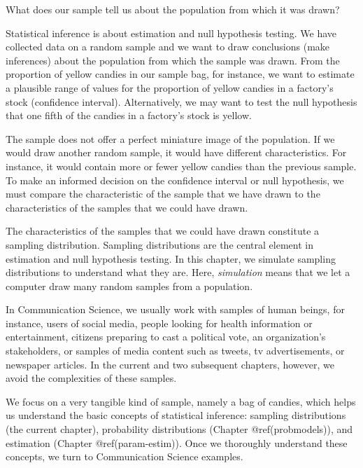 \documentclass[
  letterpaper,
  DIV=11,
  numbers=noendperiod]{scrreprt}
\begin{document}


What does our sample tell us about the population from which it was
drawn? 

Statistical inference is about estimation and null hypothesis testing.
We have collected data on a random sample and we want to draw
conclusions (make inferences) about the population from which the sample
was drawn. From the proportion of yellow candies in our sample bag, for
instance, we want to estimate a plausible range of values for the
proportion of yellow candies in a factory's stock (confidence interval).
Alternatively, we may want to test the null hypothesis that one fifth of
the candies in a factory's stock is yellow.

The sample does not offer a perfect miniature image of the population.
If we would draw another random sample, it would have different
characteristics. For instance, it would contain more or fewer yellow
candies than the previous sample. To make an informed decision on the
confidence interval or null hypothesis, we must compare the
characteristic of the sample that we have drawn to the characteristics
of the samples that we could have drawn.

The characteristics of the samples that we could have drawn constitute a
sampling distribution. Sampling distributions are the central element in
estimation and null hypothesis testing. In this chapter, we simulate
sampling distributions to understand what they are. Here,
\emph{simulation} means that we let a computer draw many random samples
from a population.

In Communication Science, we usually work with samples of human beings,
for instance, users of social media, people looking for health
information or entertainment, citizens preparing to cast a political
vote, an organization's stakeholders, or samples of media content such
as tweets, tv advertisements, or newspaper articles. In the current and
two subsequent chapters, however, we avoid the complexities of these
samples.

We focus on a very tangible kind of sample, namely a bag of candies,
which helps us understand the basic concepts of statistical inference:
sampling distributions (the current chapter), probability distributions
(Chapter @ref(probmodels)), and estimation (Chapter @ref(param-estim)).
Once we thoroughly understand these concepts, we turn to Communication
Science examples.
\end{document}
